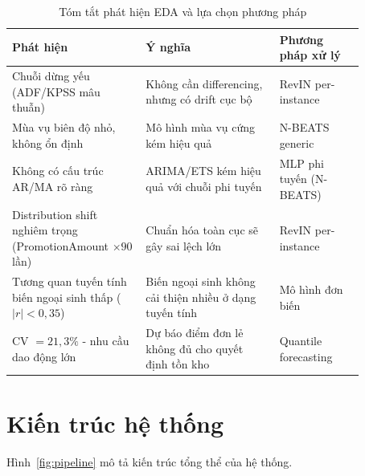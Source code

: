 \documentclass[12pt, a4paper]{report}
\begin{document}
\begin{table}[H]
\centering
\caption{Tóm tắt phát hiện EDA và lựa chọn phương pháp}
\label{tab:eda_summary}
\renewcommand{\arraystretch}{1.4}
\begin{tabular}{|
  >{\raggedright\arraybackslash}p{0.33\linewidth}|
  >{\raggedright\arraybackslash}p{0.33\linewidth}|
  >{\raggedright\arraybackslash}p{0.21\linewidth}|
}
\hline
\rowcolor{gray!18}
\textbf{Phát hiện} & \textbf{Ý nghĩa} & \textbf{Phương pháp xử lý} \\
\hline
Chuỗi dừng yếu (ADF/KPSS mâu thuẫn)
  & Không cần differencing, nhưng có drift cục bộ
  & RevIN per-instance \\
\hline
Mùa vụ biên độ nhỏ, không ổn định
  & Mô hình mùa vụ cứng kém hiệu quả
  & N-BEATS generic \\
\hline
Không có cấu trúc AR/MA rõ ràng
  & ARIMA/ETS kém hiệu quả với chuỗi phi tuyến
  & MLP phi tuyến (N-BEATS) \\
\hline
Distribution shift nghiêm trọng (PromotionAmount $\times 90$ lần)
  & Chuẩn hóa toàn cục sẽ gây sai lệch lớn
  & RevIN per-instance \\
\hline
Tương quan tuyến tính biến ngoại sinh thấp ($|r| < 0{,}35$)
  & Biến ngoại sinh không cải thiện nhiều ở dạng tuyến tính
  & Mô hình đơn biến \\
\hline
CV $= 21{,}3\%$ - nhu cầu dao động lớn
  & Dự báo điểm đơn lẻ không đủ cho quyết định tồn kho
  & Quantile forecasting \\
\hline
\end{tabular}
\end{table}

\section{Kiến trúc hệ thống}

Hình~\ref{fig:pipeline} mô tả kiến trúc tổng thể của hệ thống.
\end{document}
